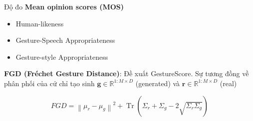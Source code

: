 

\begin{frame}{Độ đo}
	\textbf{Mean opinion scores (MOS)}
	
	\begin{itemize}
		\item Human-likeness
		\item Gesture-Speech Appropriateness
		\item Gesture-style Appropriateness
	\end{itemize}
	
	\textbf{FGD (Fréchet Gesture Distance)}: 
	Đề xuất GestureScore.
	Sự tương đồng về phân phối của cử chỉ tạo sinh $\mathbf{g} \in \mathbb{R}^{1:M \times D}$ (generated) và $\mathbf{r} \in \mathbb{R}^{1:M \times D}$ (real)
	
	\begin{equation}
	FGD = \left\| \mu_r - \mu_g \right\|^2 + \operatorname{Tr}\left( \Sigma_r + \Sigma_g - 2\sqrt{\Sigma_r \Sigma_g} \right)
	\end{equation}
	
	
	

\end{frame}
